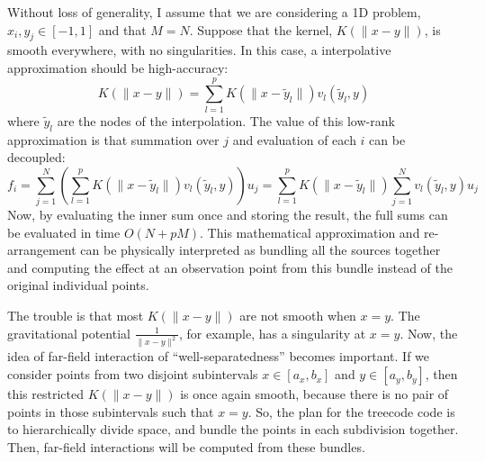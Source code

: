 \documentclass[10pt]{article}
\begin{document}
Without loss of generality, I assume that we are considering a 1D problem, $x_i, y_j \in [-1, 1]$ and that $M = N$. Suppose that the kernel, $K(\|x-y\|)$, is smooth everywhere, with no singularities. In this case, a interpolative approximation should be high-accuracy:
\begin{equation}
    K(\|x-y\|) = \sum_{l=1}^p K(\|x - \tilde{y}_l\|) v_l(\tilde{y}_l, y)
\end{equation}
where $\tilde{y}_l$ are the nodes of the interpolation.
The value of this low-rank approximation is that summation over $j$ and evaluation of each $i$ can be decoupled:
\begin{equation}
    f_i = \sum_{j=1}^N\left(\sum_{l=1}^p K(\|x - \tilde{y}_l\|) v_l(\tilde{y}_l, y)\right)u_j = \sum_{l=1}^p K(\|x - \tilde{y}_l\|) \sum_{j=1}^N v_l(\tilde{y}_l, y) u_j
\end{equation}
Now, by evaluating the inner sum once and storing the result, the full sums can be evaluated in time $O(N + pM)$. This mathematical approximation and re-arrangement can be physically interpreted as bundling all the sources together and computing the effect at an observation point from this bundle instead of the original individual points. 

The trouble is that most $K(\|x - y\|)$ are not smooth when $x = y$. The gravitational potential $\frac{1}{\|x - y\|^2}$, for example, has a singularity at $x = y$. Now, the idea of far-field interaction of ``well-separatedness'' becomes important. If we consider points from two disjoint subintervals $x \in [a_x, b_x]$ and $y \in [a_y, b_y]$, then this restricted $K(\|x - y\|)$ is once again smooth, because there is no pair of points in those subintervals such that $x = y$. So, the plan for the treecode code is to hierarchically divide space, and bundle the points in each subdivision together. Then, far-field interactions will be computed from these bundles. 
\end{document}
